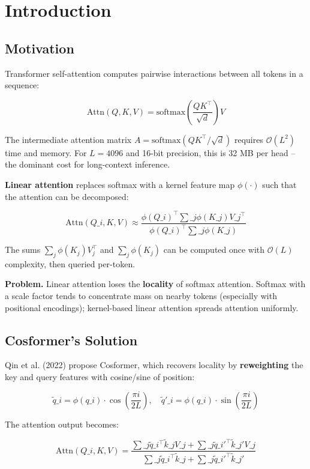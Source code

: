 
\section{Introduction}

\subsection{Motivation}

Transformer self-attention computes pairwise interactions between all tokens 
in a sequence:

\[
\text{Attn}(Q, K, V) = \text{softmax}\!\left(\frac{QK^\top}{\sqrt{d}}\right)V
\]

The intermediate attention matrix $A = \text{softmax}(QK^\top / \sqrt{d})$ 
requires $\mathcal{O}(L^2)$ time and memory. For $L = 4096$ and 16-bit 
precision, this is 32 MB per head -- the dominant cost for long-context 
inference.

\textbf{Linear attention} replaces softmax with a kernel feature map 
$\phi(\cdot)$ such that the attention can be decomposed:

\[
\text{Attn}(Q\_i, K, V) \approx \frac{\phi(Q\_i)^\top \sum\_j \phi(K\_j) V\_j^\top}{\phi(Q\_i)^\top \sum\_j \phi(K\_j)}
\]

The sums $\sum_j \phi(K_j) V_j^\top$ and $\sum_j \phi(K_j)$ can be computed 
once with $\mathcal{O}(L)$ complexity, then queried per-token.

\textbf{Problem.} Linear attention loses the \textbf{locality} of softmax attention. 
Softmax with a scale factor tends to concentrate mass on nearby tokens 
(especially with positional encodings); kernel-based linear attention 
spreads attention uniformly.

\subsection{Cosformer's Solution}

Qin et al. (2022) propose Cosformer, which recovers locality by 
\textbf{reweighting} the key and query features with cosine/sine of position:

\[
\tilde{q}\_i = \phi(q\_i) \cdot \cos\!\left(\frac{\pi i}{2 L}\right), \quad
\tilde{q}'\_i = \phi(q\_i) \cdot \sin\!\left(\frac{\pi i}{2 L}\right)
\]

The attention output becomes:

\[
\text{Attn}(Q\_i, K, V) = \frac{\sum\_j \tilde{q}\_i^\top \tilde{k}\_j V\_j + \sum\_j \tilde{q}\_i'^\top \tilde{k}\_j' V\_j}{\sum\_j \tilde{q}\_i^\top \tilde{k}\_j + \sum\_j \tilde{q}\_i'^\top \tilde{k}\_j'}
\]

